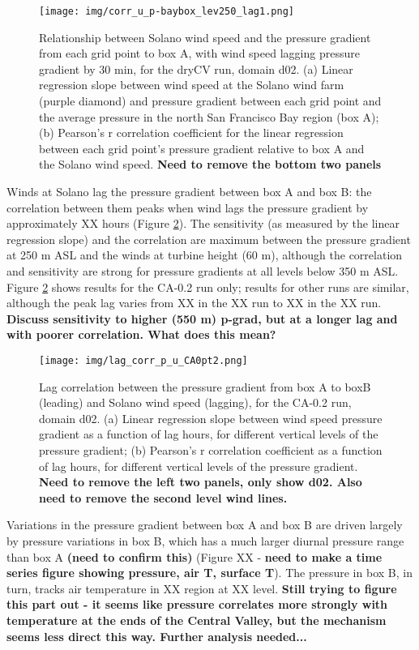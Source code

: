 \begin{figure}[here]
\texttt{[image: img/corr\_u\_p-baybox\_lev250\_lag1.png]}
\caption{Relationship between Solano wind speed and the pressure gradient from each grid point to box A, with wind speed lagging pressure gradient by 30 min, for the dryCV run, domain d02.  (a) Linear regression slope between wind speed at the Solano wind farm (purple diamond) and pressure gradient between each grid point and the average pressure in the north San Francisco Bay region (box A); (b) Pearson's r correlation coefficient for the linear regression between each grid point's pressure gradient relative to box A and the Solano wind speed.  \textbf{Need to remove the bottom two panels}}
\label{fig:windSol_corrPgradUmap}
\end{figure}

Winds at Solano lag the pressure gradient between box A and box B: the correlation between them peaks when wind lags the pressure gradient by approximately XX hours (Figure \ref{fig:windSol_lagcorrPgradU}).  The sensitivity (as measured by the linear regression slope) and the correlation are maximum between the pressure gradient at 250 m ASL and the winds at turbine height (60 m), although the correlation and sensitivity are strong for pressure gradients at all levels below 350 m ASL.  Figure \ref{fig:windSol_lagcorrPgradU} shows results for the CA-0.2 run only; results for other runs are similar, although the peak lag varies from XX in the XX run to XX in the XX run.  \textbf{Discuss sensitivity to higher (550 m) p-grad, but at a longer lag and with poorer correlation.  What does this mean?}

\begin{figure}[here]
\texttt{[image: img/lag\_corr\_p\_u\_CA0pt2.png]}
\caption{Lag correlation between the pressure gradient from box A to boxB (leading) and Solano wind speed (lagging), for the CA-0.2 run, domain d02.  (a) Linear regression slope between wind speed pressure gradient as a function of lag hours, for different vertical levels of the pressure gradient; (b) Pearson's r correlation coefficient as a function of lag hours, for different vertical levels of the pressure gradient.  \textbf{Need to remove the left two panels, only show d02.  Also need to remove the second level wind lines.}}
\label{fig:windSol_lagcorrPgradU}
\end{figure}

Variations in the pressure gradient between box A and box B are driven largely by pressure variations in box B, which has a much larger diurnal pressure range than box A \textbf{(need to confirm this)} (Figure XX - \textbf{need to make a time series figure showing pressure, air T, surface T}).  The pressure in box B, in turn, tracks air temperature in XX region at XX level.  \textbf{Still trying to figure this part out - it seems like pressure correlates more strongly with temperature at the ends of the Central Valley, but the mechanism seems less direct this way.  Further analysis needed...}

